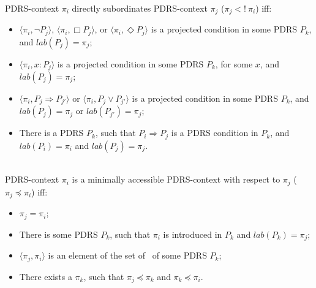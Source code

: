 \begin{subdefinition}~\\
PDRS-context $\pi_i$ directly subordinates PDRS-context $\pi_j$ 
($\pi_j <!~\pi_i$) iff:
  \begin{itemize}
    \item $\langle\pi_i,\neg P_j\rangle$,
      $\langle\pi_i,\Box P_j\rangle$,
      or $\langle\pi_i,\Diamond P_j\rangle$ is a projected condition in
      some PDRS $P_k$, and $lab(P_j) = \pi_j$;
    \item $\langle\pi_i,x:P_j\rangle$ is a projected condition in some
      PDRS $P_k$, for some $x$, and $lab(P_j) = \pi_j$;
    \item  $\langle\pi_i,P_j \Rightarrow P_{j'}\rangle$ or
      $\langle\pi_i,P_j \vee P_{j'}\rangle$ is a projected condition in
      some PDRS $P_k$, and $lab(P_j) = \pi_j$ or $lab(P_{j'}) = \pi_j$;
    \item There is a PDRS $P_k$, such that $P_i \Rightarrow P_j$ is a PDRS
      condition in $P_k$, and $lab(P_i) = \pi_i$ and $lab(P_j) = \pi_j$.
  \end{itemize}
\end{subdefinition}

\begin{subdefinition}~\\
PDRS-context $\pi_i$ is a minimally accessible PDRS-context with
respect to $\pi_j$ ($\pi_j \preceq \pi_i$) iff:
  \begin{itemize}
    \item $\pi_j = \pi_i$;
    \item There is some PDRS $P_k$, such that $\pi_i$ is introduced in $P_k$
      and $lab(P_k)=\pi_j$;
    \item $\langle \pi_j,\pi_i\rangle$ is an element of the set of
      \MAPs~of some PDRS $P_k$;
    \item There exists a $\pi_k$, such that $\pi_j \preceq \pi_k$ and $\pi_k \preceq \pi_i$.
  \end{itemize}
\end{subdefinition}


